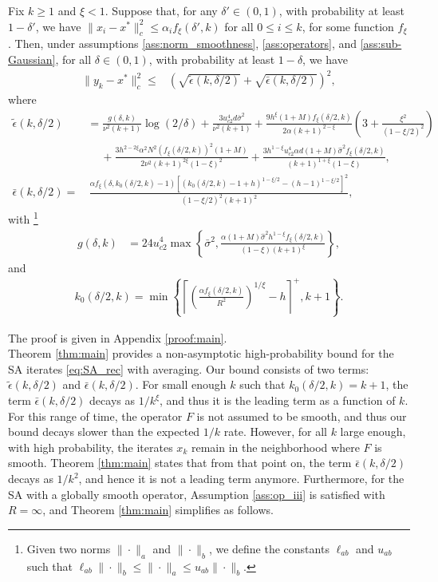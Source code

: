 \documentclass[letterpaper, 10 pt]{article}
\begin{document}
\begin{theorem}\label{thm:main}
    Fix $k\geq 1$ and $\xi<1$. Suppose that, for any $\delta'\in (0,1)$, with probability at least $1-\delta'$, we have $\|x_i-x^*\|^2_c \leq \alpha_i f_\xi(\delta',k)$ for all $0\leq i\leq k$, for some function $f_\xi$. Then, under assumptions \ref{ass:norm_smoothness}, \ref{ass:operators}, and \ref{ass:sub-Gaussian}, for all $\delta\in (0,1)$, with probability at least $1-\delta$, we have
    \begin{align*}
    \|y_k-x^*\|_c^2\leq & \left( \sqrt{\tilde{\epsilon}(k,\delta/2)} + \sqrt{\bar{\epsilon}(k,\delta/2)}\right)^2,
    \end{align*}
where
\begin{align*}
    \tilde{\epsilon}(k,\delta/2) &= \frac{g(\delta,k)}{\nu^2(k+1)}\log (2/\delta) + \frac{3u_{c2}^4d \bar{\sigma}^2}{\nu^2(k+1)} + \frac{9 h^\xi(1+M) f_\xi(\delta/2,k)}{2\alpha (k+1)^{2-\xi}} \left( 3 +\frac{\xi^2}{(1-\xi/2)^2} \right) \nonumber\\
    &\quad~+ \frac{3h^{2-2\xi}\alpha^2 N^2 (f_\xi(\delta/2,k))^2(1+M)}{2\nu^2(k+1)^{2\xi}(1-\xi)^2} + \frac{3h^{1-\xi}u_{c2}^4\alpha d(1+M)\hat{\sigma}^2f_\xi(\delta/2,k)}{(k+1)^{1+\xi}(1-\xi)},\\
    \bar{\epsilon}(k,\delta/2) =& \, \frac{\alpha f_\xi(\delta,k_0(\delta/2,k)-1)\left[(k_0(\delta/2,k)-1+h)^{1-\xi/2}-(h-1)^{1-\xi/2}\right]^2}{(1-\xi/2)^2(k+1)^{2}},
\end{align*}
with \footnote{Given two norms $\|\cdot\|_a$ and $\|\cdot\|_b$, we define the constants $\ell_{ab}$ and $u_{ab}$ such that $\ell_{ab} \|\cdot\|_b \leq \|\cdot\|_a \leq u_{ab} \|\cdot\|_b$.}
\begin{align*}
    g(\delta,k) &= 24u_{c2}^4\max \left\{\bar{\sigma}^2, \frac{\alpha (1+M)\hat{\sigma}^2h^{1-\xi}f_\xi(\delta/2,k)}{(1-\xi)(k+1)^\xi}\right\},
\end{align*} 
and 
\begin{align*}
    k_0(\delta/2,k)=\min\left\{\left\lceil\left(\frac{\alpha f_\xi(\delta/2,k)}{R^2}\right)^{1/\xi}-h\right\rceil^+,k+1\right\}.
\end{align*}
\end{theorem}
The proof is given in Appendix \ref{proof:main}.\\

Theorem \ref{thm:main} provides a non-asymptotic high-probability bound for the SA iterates \eqref{eq:SA_rec} with averaging. Our bound consists of two terms: $\tilde{\epsilon}(k,\delta/2)$ and $\bar{\epsilon}(k,\delta/2)$. For small enough $k$ such that $k_0(\delta/2,k) = k+1$, the term $\bar{\epsilon}(k,\delta/2)$ decays as $1/k^\xi$, and thus it is the leading term as a function of $k$. For this range of time, the operator $F$ is not assumed to be smooth, and thus our bound decays slower than the expected $1/k$ rate. However, for all $k$ large enough, with high probability, the iterates $x_k$ remain in the neighborhood where $F$ is smooth. Theorem \ref{thm:main} states that from that point on, the term $\bar{\epsilon}(k,\delta/2)$ decays as $1/k^2$, and hence it is not a leading term anymore. Furthermore, for the SA with a globally smooth operator, Assumption \ref{ass:op_iii} is satisfied with $R=\infty$, and Theorem \ref{thm:main} simplifies as follows.
\end{document}
